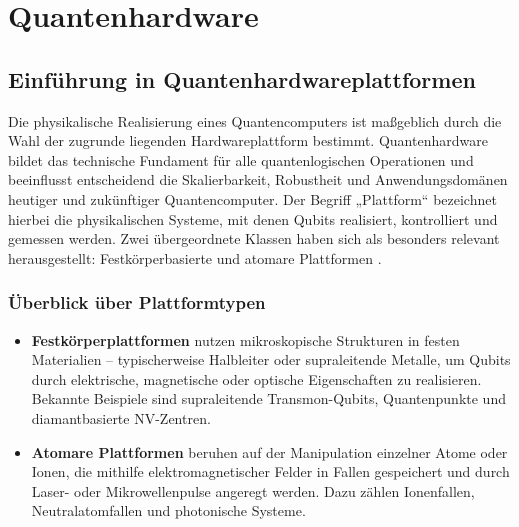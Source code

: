 

\chapter{Quantenhardware}
\label{hardware} %



\section{Einführung in Quantenhardwareplattformen}
Die physikalische Realisierung eines Quantencomputers ist maßgeblich durch die Wahl der zugrunde liegenden Hardwareplattform bestimmt. Quantenhardware bildet das technische Fundament für alle quantenlogischen Operationen und beeinflusst entscheidend die Skalierbarkeit, Robustheit und Anwendungsdomänen heutiger und zukünftiger Quantencomputer. Der Begriff „Plattform“ bezeichnet hierbei die physikalischen Systeme, mit denen Qubits realisiert, kontrolliert und gemessen werden. Zwei übergeordnete Klassen haben sich als besonders relevant herausgestellt: Festkörperbasierte und atomare Plattformen \cite{schmaltz2025, homeister2020}.

\subsection{Überblick über Plattformtypen}
\begin{itemize}
\item \textbf{Festkörperplattformen} nutzen mikroskopische Strukturen in festen Materialien – typischerweise Halbleiter oder supraleitende Metalle, um Qubits durch elektrische, magnetische oder optische Eigenschaften zu realisieren. Bekannte Beispiele sind supraleitende Transmon-Qubits, Quantenpunkte und diamantbasierte NV-Zentren.
\item \textbf{Atomare Plattformen} beruhen auf der Manipulation einzelner Atome oder Ionen, die mithilfe elektromagnetischer Felder in Fallen gespeichert und durch Laser- oder Mikrowellenpulse angeregt werden. Dazu zählen Ionenfallen, Neutralatomfallen und photonische Systeme.
\end{itemize}

